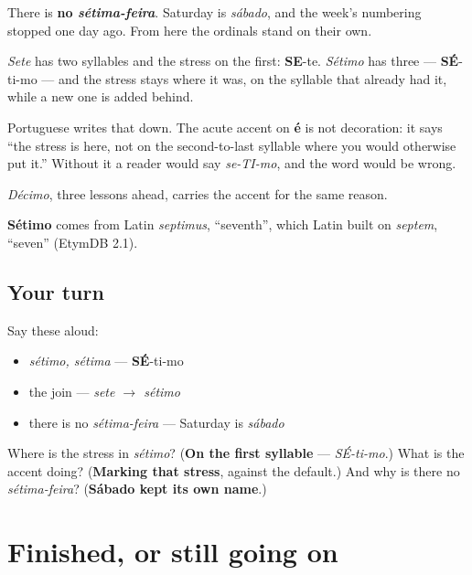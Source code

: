 There is \textbf{no \emph{sétima-feira}}. Saturday is \emph{sábado}, and the week's numbering stopped one day ago. From here the ordinals stand on their own.

\begin{cousinweb}
\emph{Sete} has two syllables and the stress on the first: \textbf{SE}-te. \emph{Sétimo} has three — \textbf{SÉ}-ti-mo — and the stress stays where it was, on the syllable that already had it, while a new one is added behind.

Portuguese writes that down. The acute accent on \textbf{é} is not decoration: it says \textquotedblleft{}the stress is here, not on the second-to-last syllable where you would otherwise put it.\textquotedblright{} Without it a reader would say \emph{se-TI-mo}, and the word would be wrong.

\emph{Décimo}, three lessons ahead, carries the accent for the same reason.

\textbf{Sétimo} comes from Latin \emph{septimus}, \textquotedblleft{}seventh\textquotedblright{}, which Latin built on \emph{septem}, \textquotedblleft{}seven\textquotedblright{} (EtymDB 2.1).
\end{cousinweb}

\subsection*{Your turn}
Say these aloud:

\begin{itemize}
\raggedright
  \item \emph{sétimo, sétima} — \textbf{SÉ}-ti-mo
  \item the join — \emph{sete $\to$ sétimo}
  \item there is no \emph{sétima-feira} — Saturday is \emph{sábado}
\end{itemize}

\begin{tcolorbox}[breakable,colback=teal!4,colframe=teal!35!black,title={Before you move on}]
Where is the stress in \emph{sétimo}? (\textbf{On the first syllable} — \emph{SÉ-ti-mo}.) What is the accent doing? (\textbf{Marking that stress}, against the default.) And why is there no \emph{sétima-feira}? (\textbf{Sábado kept its own name}.)
\end{tcolorbox}
\section[(practice)]{Finished, or still going on}

